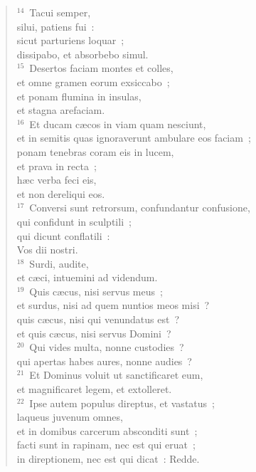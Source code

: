 \begin{flushleft}\begin{verse}${}^{14}$~Tacui semper,\\ silui, patiens fui~:\\ sicut parturiens loquar~;\\ dissipabo, et absorbebo simul.\\
${}^{15}$~Desertos faciam montes et colles,\\ et omne gramen eorum exsiccabo~;\\ et ponam flumina in insulas,\\ et stagna arefaciam.\\
${}^{16}$~Et ducam c\ae cos in viam quam nesciunt,\\ et in semitis quas ignoraverunt ambulare eos faciam~;\\ ponam tenebras coram eis in lucem,\\ et prava in recta~;\\ h\ae c verba feci eis,\\ et non dereliqui eos.\\
${}^{17}$~Conversi sunt retrorsum, confundantur confusione,\\ qui confidunt in sculptili~;\\ qui dicunt conflatili~:\\ Vos dii nostri.\\
${}^{18}$~Surdi, audite,\\ et c\ae ci, intuemini ad videndum.\\
${}^{19}$~Quis c\ae cus, nisi servus meus~;\\ et surdus, nisi ad quem nuntios meos misi~?\\ quis c\ae cus, nisi qui venundatus est~?\\ et quis c\ae cus, nisi servus Domini~?\\
${}^{20}$~Qui vides multa, nonne custodies~?\\ qui apertas habes aures, nonne audies~?\\
${}^{21}$~Et Dominus voluit ut sanctificaret eum,\\ et magnificaret legem, et extolleret.\\
${}^{22}$~Ipse autem populus direptus, et vastatus~;\\ laqueus juvenum omnes,\\ et in domibus carcerum absconditi sunt~;\\ facti sunt in rapinam, nec est qui eruat~;\\ in direptionem, nec est qui dicat~: Redde.\\

\end{verse}
\end{flushleft}
